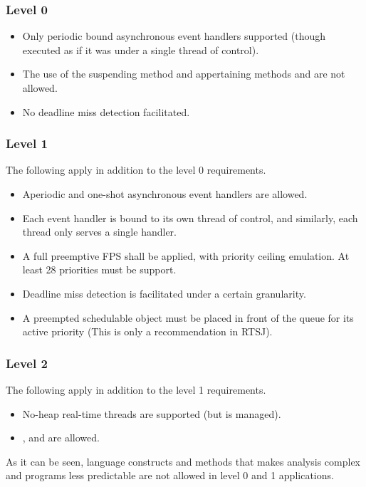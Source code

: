 \subsubsection{Level 0}
\begin{itemize}
	\item Only periodic bound asynchronous event handlers supported (though executed as if it was under a single thread of control).
	\item The use of the suspending method  and appertaining methods  and  are not allowed.
	\item No deadline miss detection facilitated.
\end{itemize}

\subsubsection{Level 1}
The following apply in addition to the level 0 requirements.
\begin{itemize}
	\item Aperiodic and one-shot asynchronous event handlers are allowed.
	\item Each event handler is bound to its own thread of control, and similarly, each thread only serves a single handler.
	\item A full preemptive FPS shall be applied, with priority ceiling emulation. At least 28 priorities must be support.
	\item Deadline miss detection is facilitated under a certain granularity.
	\item A preempted schedulable object must be placed in front of the queue for its active priority (This is only a recommendation in RTSJ).
\end{itemize}

\subsubsection{Level 2}
The following apply in addition to the level 1 requirements.
\begin{itemize}
	\item No-heap real-time threads are supported (but is managed).
	\item {},  and  are allowed.
\end{itemize}

As it can be seen, language constructs and methods that makes analysis complex and programs less predictable are not allowed in level 0 and 1 applications. 

